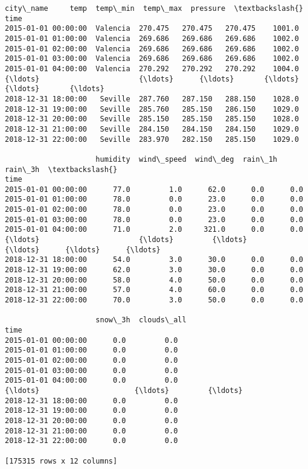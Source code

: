 \documentclass[11pt]{article}
\makeatletter
\newcommand{\boxspacing}{\kern\kvtcb@left@rule\kern\kvtcb@boxsep}
\newcommand{\prompt}[4]{
        {\ttfamily\llap{{\color{#2}[#3]:\hspace{3pt}#4}}\vspace{-\baselineskip}}
    }
\makeatother
\begin{document}
            \begin{tcolorbox}[breakable, size=fbox, boxrule=.5pt, pad at break*=1mm, opacityfill=0]
\prompt{Out}{outcolor}{86}{\boxspacing}
\begin{Verbatim}[commandchars=\\\{\}]
                    city\_name     temp  temp\_min  temp\_max  pressure  \textbackslash{}
time
2015-01-01 00:00:00  Valencia  270.475   270.475   270.475    1001.0
2015-01-01 01:00:00  Valencia  269.686   269.686   269.686    1002.0
2015-01-01 02:00:00  Valencia  269.686   269.686   269.686    1002.0
2015-01-01 03:00:00  Valencia  269.686   269.686   269.686    1002.0
2015-01-01 04:00:00  Valencia  270.292   270.292   270.292    1004.0
{\ldots}                       {\ldots}      {\ldots}       {\ldots}       {\ldots}       {\ldots}
2018-12-31 18:00:00   Seville  287.760   287.150   288.150    1028.0
2018-12-31 19:00:00   Seville  285.760   285.150   286.150    1029.0
2018-12-31 20:00:00   Seville  285.150   285.150   285.150    1028.0
2018-12-31 21:00:00   Seville  284.150   284.150   284.150    1029.0
2018-12-31 22:00:00   Seville  283.970   282.150   285.150    1029.0

                     humidity  wind\_speed  wind\_deg  rain\_1h  rain\_3h  \textbackslash{}
time
2015-01-01 00:00:00      77.0         1.0      62.0      0.0      0.0
2015-01-01 01:00:00      78.0         0.0      23.0      0.0      0.0
2015-01-01 02:00:00      78.0         0.0      23.0      0.0      0.0
2015-01-01 03:00:00      78.0         0.0      23.0      0.0      0.0
2015-01-01 04:00:00      71.0         2.0     321.0      0.0      0.0
{\ldots}                       {\ldots}         {\ldots}       {\ldots}      {\ldots}      {\ldots}
2018-12-31 18:00:00      54.0         3.0      30.0      0.0      0.0
2018-12-31 19:00:00      62.0         3.0      30.0      0.0      0.0
2018-12-31 20:00:00      58.0         4.0      50.0      0.0      0.0
2018-12-31 21:00:00      57.0         4.0      60.0      0.0      0.0
2018-12-31 22:00:00      70.0         3.0      50.0      0.0      0.0

                     snow\_3h  clouds\_all
time
2015-01-01 00:00:00      0.0         0.0
2015-01-01 01:00:00      0.0         0.0
2015-01-01 02:00:00      0.0         0.0
2015-01-01 03:00:00      0.0         0.0
2015-01-01 04:00:00      0.0         0.0
{\ldots}                      {\ldots}         {\ldots}
2018-12-31 18:00:00      0.0         0.0
2018-12-31 19:00:00      0.0         0.0
2018-12-31 20:00:00      0.0         0.0
2018-12-31 21:00:00      0.0         0.0
2018-12-31 22:00:00      0.0         0.0

[175315 rows x 12 columns]
\end{Verbatim}
\end{tcolorbox}
        
\end{document}
